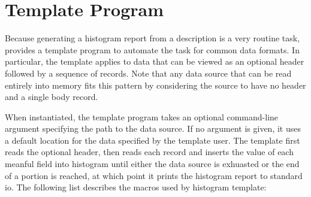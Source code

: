 \section{Template Program}
Because generating a histogram report from a \pads{} description is a
very routine task, \pads{} provides a template program to automate the
task for common data formats. In particular, the template applies to
data that can be viewed as an optional header followed by a sequence
of records. Note that any data source that can be read entirely into
memory fits this pattern by considering the source to have no header
and a single body record. 

When instantiated, the template program takes an optional command-line
argument specifying the path to the data source. If no argument is
given, it uses a default location for the data specified by the
template user. The template first reads the optional header, then
reads each record and inserts the value of each meanful field into
histogram until either the data source is exhuasted or the end of a
portion is reached, at which point it prints the histogram report to
standard io. The following list describes the macros used by
histogram template:

